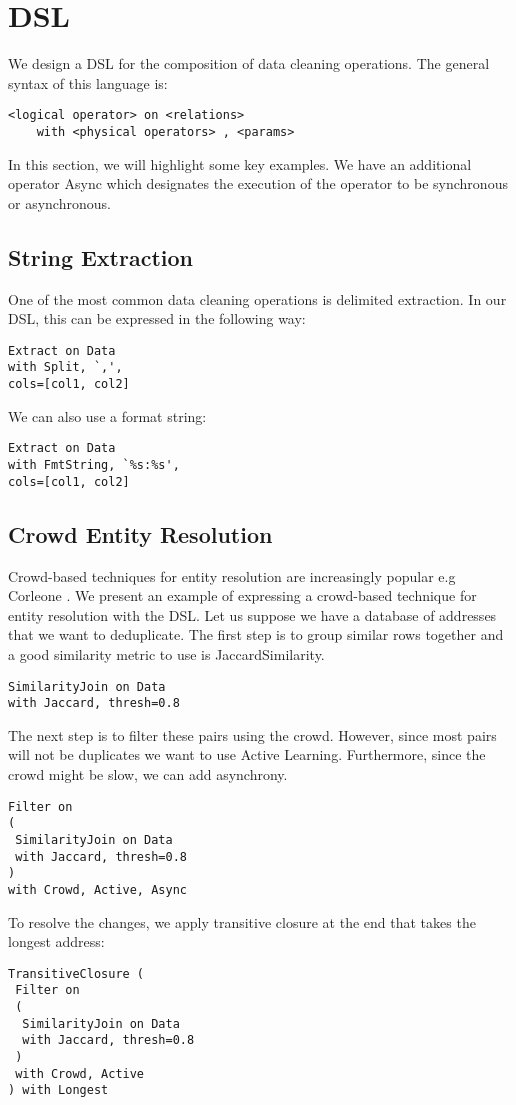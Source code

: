 \section{\projx DSL}
We design a DSL for the composition of data cleaning operations.
The general syntax of this language is:
\begin{lstlisting}
<logical operator> on <relations>
	with <physical operators> , <params>
\end{lstlisting}
In this section, we will highlight some key examples.
We have an additional operator \textsf{Async} which designates the 
execution of the operator to be synchronous or asynchronous.

\subsection{String Extraction}
One of the most common data cleaning operations is delimited extraction.
In our DSL, this can be expressed in the following way:
\begin{lstlisting}
Extract on Data
with Split, `,',
cols=[col1, col2]
\end{lstlisting}

We can also use a format string:
\begin{lstlisting}
Extract on Data
with FmtString, `%s:%s',
cols=[col1, col2]
\end{lstlisting}

\subsection{Crowd Entity Resolution}
Crowd-based techniques for entity resolution are increasingly popular e.g Corleone \cite{DBLP:conf/sigmod/GokhaleDDNRSZ14}.
We present an example of expressing a crowd-based technique for entity resolution with the DSL.
Let us suppose we have a database of addresses that we want to deduplicate.
The first step is to group similar rows together and a good similarity metric to use is JaccardSimilarity.
\begin{lstlisting}
SimilarityJoin on Data
with Jaccard, thresh=0.8
\end{lstlisting}
The next step is to filter these pairs using the crowd. 
However, since most pairs will not be duplicates we want to use Active Learning.
Furthermore, since the crowd might be slow, we can add asynchrony.
\begin{lstlisting}
Filter on
( 
 SimilarityJoin on Data
 with Jaccard, thresh=0.8
)
with Crowd, Active, Async
\end{lstlisting}
To resolve the changes, we apply transitive closure at the end that takes the 
longest address:
\begin{lstlisting}
TransitiveClosure (
 Filter on
 ( 
  SimilarityJoin on Data
  with Jaccard, thresh=0.8
 )
 with Crowd, Active
) with Longest
\end{lstlisting}



